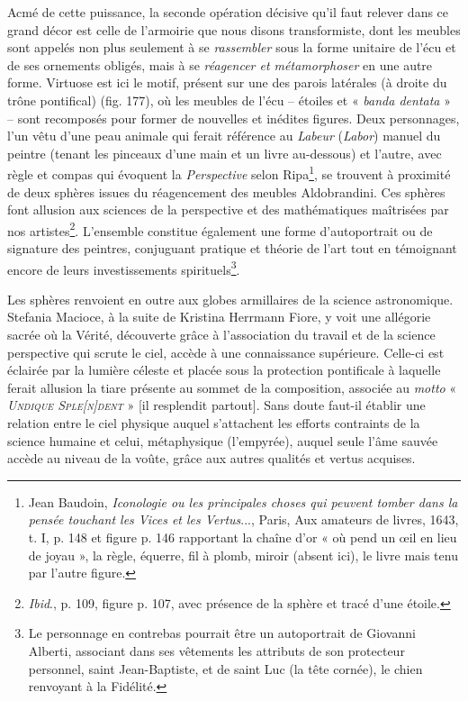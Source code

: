 \documentclass[12pt,twoside,openany]{book}
\begin{document}
Acmé de cette puissance, la seconde opération décisive qu’il faut relever dans ce grand décor est celle de l’armoirie que nous disons transformiste, dont les meubles sont appelés non plus seulement à se \textit{rassembler} sous la forme unitaire de l’écu et de ses ornements obligés, mais à se \textit{réagencer et métamorphoser} en une autre forme. Virtuose est ici le motif, présent sur une des parois latérales (à droite du trône pontifical) (fig. 177), où les meubles de l’écu – étoiles et « \textit{banda dentata} » – sont recomposés pour former de nouvelles et inédites figures. Deux personnages, l’un vêtu d’une peau animale qui ferait référence au \textit{Labeur} (\textit{Labor}) manuel du peintre (tenant les pinceaux d’une main et un livre au-dessous) et l’autre, avec règle et compas qui évoquent la \textit{Perspective} selon Ripa\footnote{Jean Baudoin, \textit{Iconologie ou les principales choses qui peuvent tomber dans la pensée touchant les Vices et les Vertus}..., Paris, Aux amateurs de livres, 1643, t. I, p. 148 et figure p. 146 rapportant la chaîne d’or « où pend un œil en lieu de joyau », la règle, équerre, fil à plomb, miroir (absent ici), le livre mais tenu par l’autre figure.}, se trouvent à proximité de deux sphères issues du réagencement des meubles Aldobrandini. Ces sphères font allusion aux sciences de la perspective et des mathématiques maîtrisées par nos artistes\footnote{\textit{Ibid}., p. 109, figure p. 107, avec présence de la sphère et tracé d’une étoile.}. L’ensemble constitue également une forme d’autoportrait ou de signature des peintres, conjuguant pratique et théorie de l’art tout en témoignant encore de leurs investissements spirituels\footnote{Le personnage en contrebas pourrait être un autoportrait de Giovanni Alberti, associant dans ses vêtements les attributs de son protecteur personnel, saint Jean-Baptiste, et de saint Luc (la tête cornée), le chien renvoyant à la Fidélité.}.

Les sphères renvoient en outre aux globes armillaires de la science astronomique. Stefania Macioce, à la suite de Kristina Herrmann Fiore, y voit une allégorie sacrée où la Vérité, découverte grâce à l’association du travail et de la science perspective qui scrute le ciel, accède à une connaissance supérieure. Celle-ci est éclairée par la lumière céleste et placée sous la protection pontificale à laquelle ferait allusion la tiare présente au sommet de la composition, associée au \textit{motto} « \textit{\textsc{Undique Sple[n]dent}} » [il resplendit partout]. Sans doute faut-il établir une relation entre le ciel physique auquel s’attachent les efforts contraints de la science humaine et celui, métaphysique (l’empyrée), auquel seule l’âme sauvée accède au niveau de la voûte, grâce aux autres qualités et vertus acquises.
\end{document}
